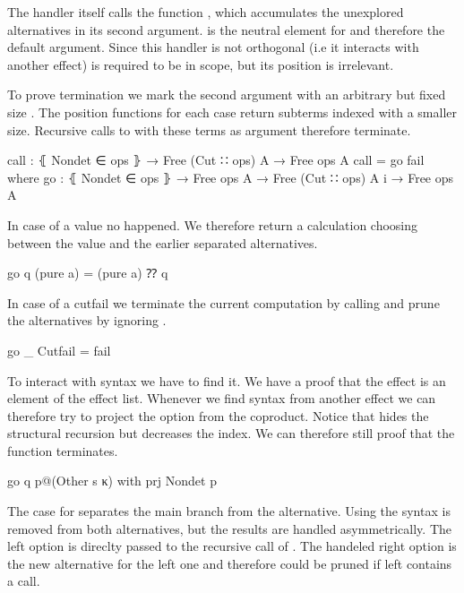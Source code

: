 \begin{AgdaAlign}
The handler itself calls the function , which accumulates the
unexplored alternatives in its second argument.
 is the neutral element for  and therefore
the default argument.
Since this handler is not orthogonal (i.e it interacts with another effect)
 is required to be in scope, but its position is irrelevant.

To prove termination we mark the second argument with an arbitrary but fixed size
.
The position functions for each case return subterms indexed with a smaller size.
Recursive calls to  with these terms as argument therefore
terminate.

\begin{code}
call : ⦃ Nondet ∈ ops ⦄ → Free (Cut ∷ ops) A → Free ops A
call = go fail
  where
    go : ⦃ Nondet ∈ ops ⦄ → Free ops A → Free (Cut ∷ ops) A {i} → Free ops A
\end{code}
In case of a  value no 
happened.
We therefore return a calculation choosing between the value and the earlier
separated alternatives.

\begin{code}
    go q (pure a)       = (pure a) ⁇ q
\end{code}
In case of a cutfail we terminate the current computation by calling
 and prune the alternatives by ignoring .

\begin{code}
    go _ Cutfail        = fail
\end{code}
To interact with  syntax we have to find it.
We have a proof that the  effect is an element of the effect
list.
Whenever we find syntax from another effect we can therefore try to project the
 option from the coproduct.
Notice that  hides the structural recursion but decreases the
 index.
We can therefore still proof that the function terminates.

\begin{code}
    go q p@(Other s κ)  with prj {Nondet} p
\end{code}
The case for  separates the main branch from the alternative.
Using  the  syntax is removed from both
alternatives, but the results are handled asymmetrically.
The left option is direclty passed to the recursive call of
.
The handeled right option is the new alternative for the left one and therefore
could be pruned if left contains a  call.


\end{AgdaAlign}
